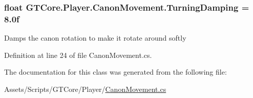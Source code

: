 \subsubsection[{Turning\+Damping}]{\setlength{\rightskip}{0pt plus 5cm}float G\+T\+Core.\+Player.\+Canon\+Movement.\+Turning\+Damping = 8.\+0f}\label{class_g_t_core_1_1_player_1_1_canon_movement_ad2b5f9544754bdc5104cbb98787dbedf}


Damps the canon rotation to make it rotate around softly 



Definition at line 24 of file Canon\+Movement.\+cs.



The documentation for this class was generated from the following file\+:\begin{DoxyCompactItemize}
\item 
Assets/\+Scripts/\+G\+T\+Core/\+Player/\hyperlink{_canon_movement_8cs}{Canon\+Movement.\+cs}\end{DoxyCompactItemize}
